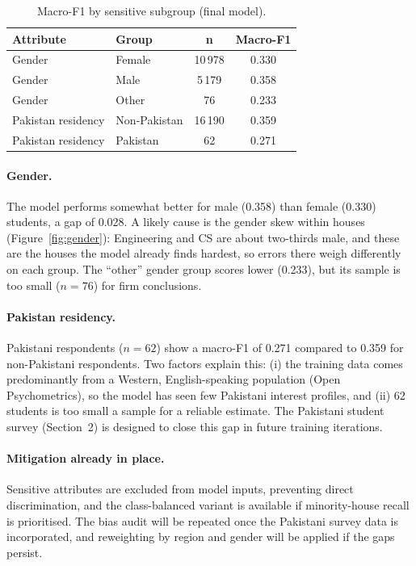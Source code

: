\begin{table}[h]
\centering
\caption{Macro-F1 by sensitive subgroup (final model).}
\label{tab:bias}
\begin{tabular}{llcc}
\toprule
\textbf{Attribute} & \textbf{Group} & \textbf{n} & \textbf{Macro-F1} \\
\midrule
Gender & Female & 10\,978 & 0.330 \\
Gender & Male   &  5\,179 & 0.358 \\
Gender & Other  &     76  & 0.233 \\
\midrule
Pakistan residency & Non-Pakistan & 16\,190 & 0.359 \\
Pakistan residency & Pakistan     &     62  & 0.271 \\
\bottomrule
\end{tabular}
\end{table}

\paragraph{Gender.}
The model performs somewhat better for male (0.358) than female (0.330)
students, a gap of 0.028. A likely cause is the gender skew within houses
(Figure~\ref{fig:gender}): Engineering and CS are about two-thirds male,
and these are the houses the model already finds hardest, so errors there
weigh differently on each group. The ``other'' gender group scores lower
(0.233), but its sample is too small ($n=76$) for firm conclusions.

\paragraph{Pakistan residency.}
Pakistani respondents ($n=62$) show a macro-F1 of 0.271 compared
to 0.359 for non-Pakistani respondents. Two factors explain this:
(i) the training data comes predominantly from a Western, English-speaking
population (Open Psychometrics), so the model has seen few Pakistani
interest profiles, and (ii) 62 students is too small a sample for a
reliable estimate. The Pakistani student survey (Section~2) is designed
to close this gap in future training iterations.

\paragraph{Mitigation already in place.}
Sensitive attributes are excluded from model inputs, preventing direct
discrimination, and the class-balanced variant is available if minority-house
recall is prioritised. The bias audit will be repeated once the Pakistani
survey data is incorporated, and reweighting by region and gender will be
applied if the gaps persist.

